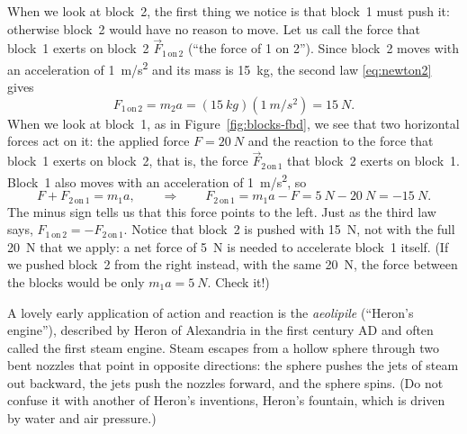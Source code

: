\documentclass[11pt,a4paper]{article}
\newcommand{\on}[2]{#1\,\mathrm{on}\,#2}   %
\begin{document}
When we look at block~2, the first thing we notice is that block~1 must push it: otherwise block~2
would have no reason to move. Let us call the force that block~1 exerts on block~2
$\vec{F}_{\on{1}{2}}$ (``the force of 1 on 2''). Since block~2 moves with an acceleration of
\qty{1}{m/s^2} and its mass is \qty{15}{kg}, the second law \eqref{eq:newton2} gives
\begin{equation}\label{eq:F12}
  F_{\on{1}{2}} = m_2 a = (\qty{15}{kg})(\qty{1}{m/s^2}) = \qty{15}{N} .
\end{equation}
When we look at block~1, as in Figure~\ref{fig:blocks-fbd}, we see that two horizontal forces act
on it: the applied force $F = \qty{20}{N}$ and the reaction to the force that block~1 exerts on
block~2, that is, the force $\vec{F}_{\on{2}{1}}$ that block~2 exerts on block~1. Block~1 also moves
with an acceleration of \qty{1}{m/s^2}, so
\begin{equation}\label{eq:F21}
  F + F_{\on{2}{1}} = m_1 a , \qquad \Rightarrow \qquad
  F_{\on{2}{1}} = m_1 a - F = \qty{5}{N} - \qty{20}{N} = \qty{-15}{N} .
\end{equation}
The minus sign tells us that this force points to the left. Just as the third law says,
$F_{\on{1}{2}} = -F_{\on{2}{1}}$. Notice that block~2 is pushed with \qty{15}{N}, not with the full
\qty{20}{N} that we apply: a net force of \qty{5}{N} is needed to accelerate block~1 itself. (If we
pushed block~2 from the right instead, with the same \qty{20}{N}, the force between the blocks would
be only $m_1 a = \qty{5}{N}$. Check it!)

A lovely early application of action and reaction is the \emph{aeolipile} (``Heron's engine''),
described by Heron of Alexandria in the first century AD and often called the first steam engine.
Steam escapes from a hollow sphere through two bent nozzles that point in opposite directions: the
sphere pushes the jets of steam out backward, the jets push the nozzles forward, and the sphere
spins. (Do not confuse it with another of Heron's
inventions, Heron's fountain, which is driven by water and air pressure.)
\end{document}
